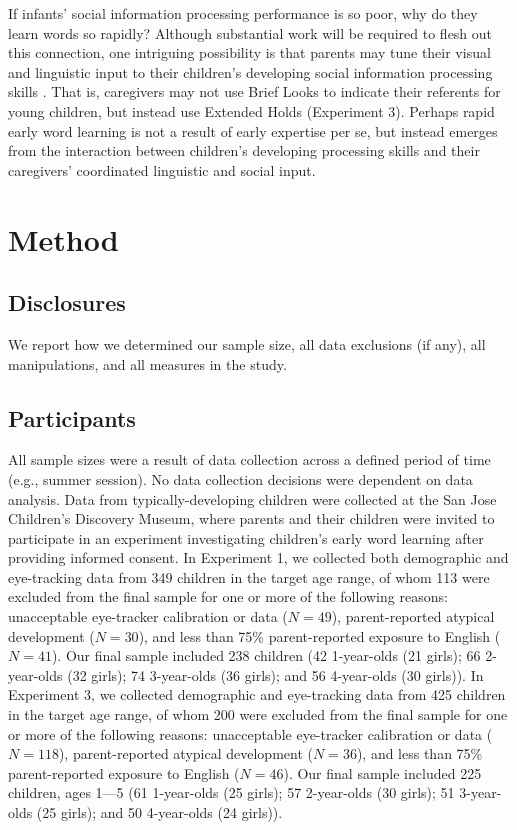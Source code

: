 \documentclass[man,floatsintext]{apa6}
\begin{document}
If infants' social information processing performance is so poor, why do they learn words so rapidly? Although substantial work will be required to flesh out this connection, one intriguing possibility is that parents may tune their visual and linguistic input to their children's developing social information processing skills \cite{snow1972,gogate2000,brand2002}. That is, caregivers may not use Brief Looks to indicate their referents for young children, but instead use Extended Holds (Experiment 3). Perhaps rapid early word learning is not a result of early expertise per se, but instead emerges from the interaction between children's developing processing skills and their caregivers' coordinated linguistic and social input.

\section{Method}

\setlength{\parskip}{0em}

\subsection{Disclosures} We report how we determined our sample size, all data exclusions (if any), all manipulations, and all measures in the study.

\subsection{Participants} All sample sizes were a result of data collection across a defined period of time (e.g., summer session). No data collection decisions were dependent on data analysis. Data from typically-developing children were collected at the San Jose Children's Discovery Museum, where parents and their children were invited to participate in an experiment investigating children's early word learning after providing informed consent.
In Experiment 1, we collected both demographic and eye-tracking data from 349 children in the target age range, of whom 113 were excluded from the final sample for one or more of the following reasons: unacceptable eye-tracker calibration or data ({\small$N=49$}), parent-reported atypical development  ({\small$N=30$}), and less than 75\% parent-reported exposure to English ({\small$N=41$}). Our final sample included 238 children (42 1-year-olds (21 girls); 66 2-year-olds (32 girls); 74 3-year-olds (36 girls); and 56 4-year-olds (30 girls)). In Experiment 3, we collected demographic and eye-tracking data from 425 children in the target age range, of whom 200 were excluded from the final sample for one or more of the following reasons: unacceptable eye-tracker calibration or data ({\small$N=118$}), parent-reported atypical development ({\small$N=36$}), and less than 75\% parent-reported exposure to English ({\small$N=46$}). Our final sample included 225 children, ages 1---5 (61 1-year-olds (25 girls); 57 2-year-olds (30 girls); 51 3-year-olds (25 girls); and 50 4-year-olds (24 girls)).
\end{document}
